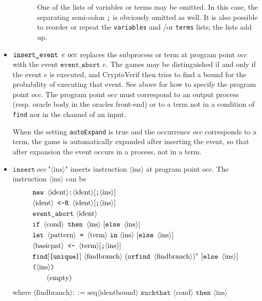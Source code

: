 \documentclass{article}
\newcommand{\nonterm}[1]{\langle\textrm{#1}\rangle}
\newcommand{\seq}[1]{\textrm{seq}\nonterm{#1}}
\begin{document}
\begin{itemize}
\begin{itemize}
\begin{enumerate}
One of the lists of variables or terms may be omitted.
In this case, the separating semi-colon \texttt{;} is obviously
omitted as well. It is also possible to reorder or repeat the
\texttt{variables} and /or \texttt{terms} lists; the lists add up.

\end{enumerate}
\end{itemize}

\sloppy

\item $\texttt{insert\string_event }e\ occ$ replaces the subprocess or term at
program point $occ$ with the event $\texttt{event\_abort }e$. The games may
be distinguished if and only if the event $e$ is executed, and CryptoVerif
then tries to find a bound for the probability of executing that event.
See above for how to specify the program point $occ$.
The program point $occ$ must correspond to an output process
(resp. oracle body in the oracles front-end) or to a term not in a
condition of {\tt find} nor in the channel of an input.

\fussy

When the setting {\tt autoExpand} is true and the occurrence $occ$
corresponds to a term, the game is automatically expanded after
inserting the event, so that after expansion the event occurs in a
process, not in a term.

\item $\texttt{insert}\ occ\ \texttt{"}\nonterm{ins}\texttt{"}$ inserts instruction $\nonterm{ins}$ at
program point $occ$. The instruction $\nonterm{ins}$ can be 
\begin{align*}
&\Resavt[\texttt{;}\nonterm{ins}]\\
  &\Resbvt[\texttt{;}\nonterm{ins}]\\
  &\texttt{event\_abort}\ \nonterm{ident}\\
&\texttt{if }\nonterm{cond}\texttt{ then }\nonterm{ins}\ [\texttt{else }\nonterm{ins}]\\
&\texttt{let }\nonterm{pattern} \texttt{ = }\nonterm{term}\ \texttt{in}\ \nonterm{ins}\ [\texttt{else }\nonterm{ins}]\\
&\nonterm{basicpat} \texttt{ <- }\nonterm{term}[\texttt{;}\nonterm{ins}]\\
  &\texttt{find}[\texttt{[unique]}]\ \nonterm{findbranch}\ (\texttt{orfind }\nonterm{findbranch})^*\ [\texttt{else }\nonterm{ins}]\\
  &\texttt{(}\nonterm{ins}\texttt{)}\\
  &\tag{empty}
\end{align*}
where $\nonterm{findbranch} ::= \seq{identbound} \texttt{ suchthat }\nonterm{cond}\texttt{ then }\nonterm{ins}$


\end{itemize}
\end{document}
